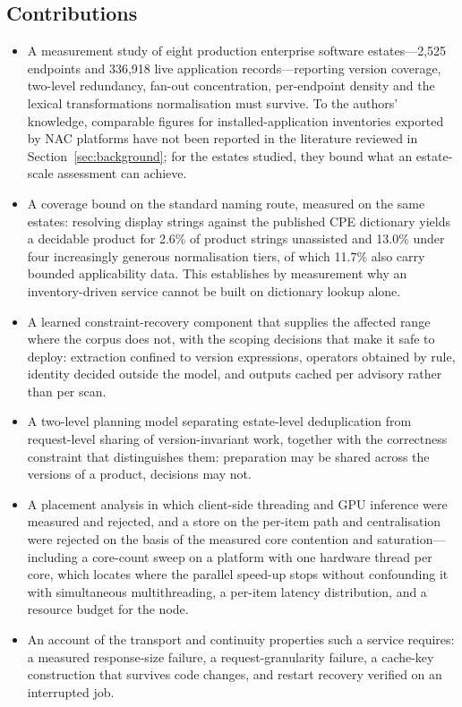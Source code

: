 \documentclass[fleqn,10pt,lineno]{wlpeerj}
\begin{document}
\subsection{Contributions}

\begin{itemize}[noitemsep]
\item A measurement study of eight production enterprise software estates---2,525 endpoints and 336,918 live application records---reporting version coverage, two-level redundancy, fan-out concentration, per-endpoint density and the lexical transformations normalisation must survive. To the authors' knowledge, comparable figures for installed-application inventories exported by NAC platforms have not been reported in the literature reviewed in Section~\ref{sec:background}; for the estates studied, they bound what an estate-scale assessment can achieve.
\item A coverage bound on the standard naming route, measured on the same estates: resolving display strings against the published CPE dictionary yields a decidable product for 2.6\% of product strings unassisted and 13.0\% under four increasingly generous normalisation tiers, of which 11.7\% also carry bounded applicability data. This establishes by measurement why an inventory-driven service cannot be built on dictionary lookup alone.
\item A learned constraint-recovery component that supplies the affected range where the corpus does not, with the scoping decisions that make it safe to deploy: extraction confined to version expressions, operators obtained by rule, identity decided outside the model, and outputs cached per advisory rather than per scan.
\item A two-level planning model separating estate-level deduplication from request-level sharing of version-invariant work, together with the correctness constraint that distinguishes them: preparation may be shared across the versions of a product, decisions may not.
\item A placement analysis in which client-side threading and GPU inference were measured and rejected, and a store on the per-item path and centralisation were rejected on the basis of the measured core contention and saturation---including a core-count sweep on a platform with one hardware thread per core, which locates where the parallel speed-up stops without confounding it with simultaneous multithreading, a per-item latency distribution, and a resource budget for the node.
\item An account of the transport and continuity properties such a service requires: a measured response-size failure, a request-granularity failure, a cache-key construction that survives code changes, and restart recovery verified on an interrupted job.
\end{itemize}
\end{document}
